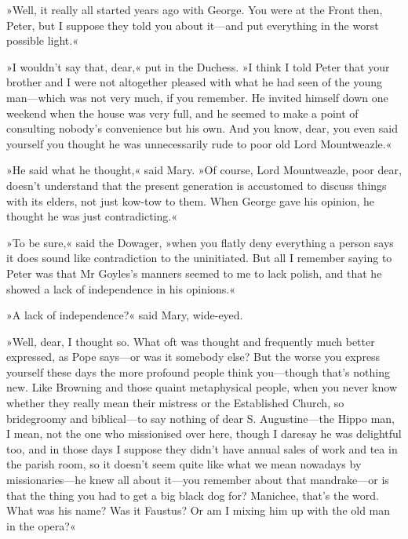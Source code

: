 »Well, it really all started years ago with George. You were at the Front then, Peter, but I suppose they told you about it\allowbreak---\allowbreak and put everything in the worst possible light.«

»I wouldn't say that, dear,« put in the Duchess. »I think I told Peter that your brother and I were not altogether pleased with what he had seen of the young man\allowbreak---\allowbreak which was not very much, if you remember. He invited himself down one weekend when the house was very full, and he seemed to make a point of consulting nobody's convenience but his own. And you know, dear, you even said yourself you thought he was unnecessarily rude to poor old Lord Mountweazle.«

»He said what he thought,« said Mary. »Of course, Lord Mountweazle, poor dear, doesn't understand that the present generation is accustomed to discuss things with its elders, not just kow-tow to them. When George gave his opinion, he thought he was just contradicting.«

»To be sure,« said the Dowager, »when you flatly deny everything a person says it does sound like contradiction to the uninitiated. But all I remember saying to Peter was that Mr Goyles's manners seemed to me to lack polish, and that he showed a lack of independence in his opinions.«

»A lack of independence?« said Mary, wide-eyed.

»Well, dear, I thought so. What oft was thought and frequently much better expressed, as Pope says\allowbreak---\allowbreak or was it somebody else? But the worse you express yourself these days the more profound people think you\allowbreak---\allowbreak though that's nothing new. Like Browning and those quaint metaphysical people, when you never know whether they really mean their mistress or the Established Church, so bridegroomy and biblical\allowbreak---\allowbreak to say nothing of dear S. Augustine\allowbreak---\allowbreak the Hippo man, I mean, not the one who missionised over here, though I daresay he was delightful too, and in those days I suppose they didn't have annual sales of work and tea in the parish room, so it doesn't seem quite like what we mean nowadays by missionaries\allowbreak---\allowbreak he knew all about it\allowbreak---\allowbreak you remember about that mandrake\allowbreak---\allowbreak or is that the thing you had to get a big black dog for?  Manichee, that's the word. What was his name? Was it Faustus? Or am I mixing him up with the old man in the opera?«


